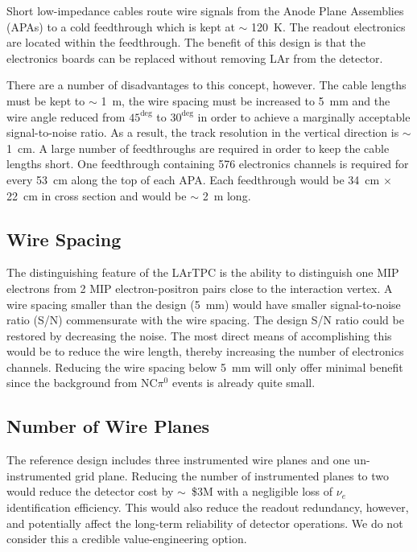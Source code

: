 Short low-impedance cables route wire signals from the Anode Plane Assemblies (APAs) to a cold feedthrough which is kept at $\sim$ 120~K. The readout electronics are located within the feedthrough. The benefit of this design is that the electronics boards can be replaced without removing LAr from the detector.

There are a number of disadvantages to this concept, however. The cable lengths must be kept to $\sim$ 1~m,  the wire spacing must be increased to 5~mm and the wire angle reduced from $45^{\deg}$ to $30^{\deg}$ in order to achieve a marginally acceptable signal-to-noise ratio. As a result, the track resolution in the vertical direction is $\sim$ 1~cm. A large number of feedthroughs are required in order to keep the cable lengths short. One feedthrough containing 576 electronics channels is required for every 53~cm along the top of each APA. Each feedthrough would be 34~cm $\times$ 22~cm in cross section and would be $\sim$ 2~m long.

\subsection{Wire Spacing}

The distinguishing feature of the LArTPC is the ability to distinguish one MIP electrons from 2 MIP electron-positron pairs close to the interaction vertex. A wire spacing smaller than the design (5~mm) would have smaller signal-to-noise ratio (S/N) commensurate with the wire spacing. The design S/N ratio could be restored by decreasing the noise. The most direct means of accomplishing this would be to reduce the wire length, thereby increasing the number of electronics channels. Reducing the wire spacing below 5~mm will only offer minimal benefit since the background from NC$\pi^0$ events is already quite small. 

\subsection{Number of Wire Planes}

The reference design includes three instrumented wire planes and one un-instrumented grid plane. Reducing the number of instrumented planes to two would reduce the detector cost by $\sim$\ \$3M with a negligible loss of $\nu_e$ identification efficiency. This would also reduce the readout redundancy, however, and potentially affect the long-term reliability of detector operations. We do not consider this a credible value-engineering option.

